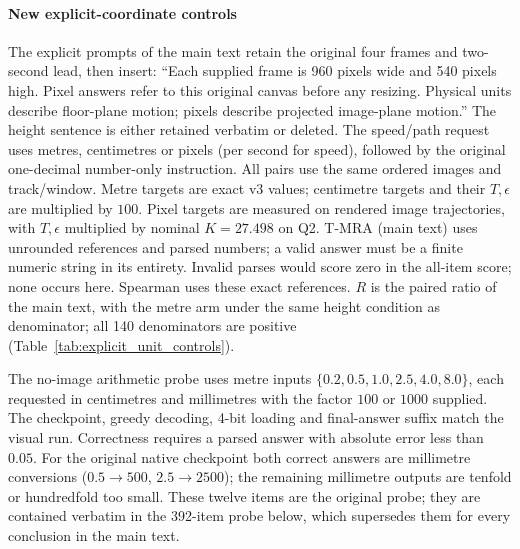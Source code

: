 \documentclass[11pt]{article}
\begin{document}
\paragraph{New explicit-coordinate controls}
\label{app:explicit_unit_controls}
The explicit prompts of the main text retain the original four frames and
two-second lead, then insert: ``Each supplied frame is 960 pixels wide and
540 pixels high. Pixel answers refer to this original canvas before any
resizing. Physical units describe floor-plane motion; pixels describe
projected image-plane motion.'' The height sentence is either retained
verbatim or deleted. The speed/path request uses metres, centimetres or
pixels (per second for speed), followed by the original one-decimal
number-only instruction. All pairs use the same ordered images and
track/window. Metre targets are exact v3 values; centimetre targets and their
$T,\epsilon$ are multiplied by $100$. Pixel targets are measured on rendered
image trajectories, with $T,\epsilon$ multiplied by nominal $K=27.498$ on Q2.
T-MRA (main text) uses unrounded references and parsed numbers; a valid
answer must be a finite numeric string in its entirety. Invalid parses would
score zero in the all-item score; none occurs here. Spearman uses these exact
references. $R$ is the paired ratio of the main text, with the metre
arm under the same height condition as denominator; all 140 denominators are positive (Table~\ref{tab:explicit_unit_controls}).

The no-image arithmetic probe uses metre inputs
$\{0.2,0.5,1.0,2.5,4.0,8.0\}$, each requested in centimetres and millimetres
with the factor $100$ or $1000$ supplied. The checkpoint, greedy decoding,
4-bit loading and final-answer suffix match the visual run. Correctness
requires a parsed answer with absolute error less than $0.05$. For the original
native checkpoint both correct answers are millimetre conversions ($0.5\to500$,
$2.5\to2500$); the remaining millimetre outputs are tenfold or hundredfold too
small. These twelve items are the original probe; they are contained verbatim in
the 392-item probe below, which supersedes them for every conclusion in the
main text.
\end{document}

